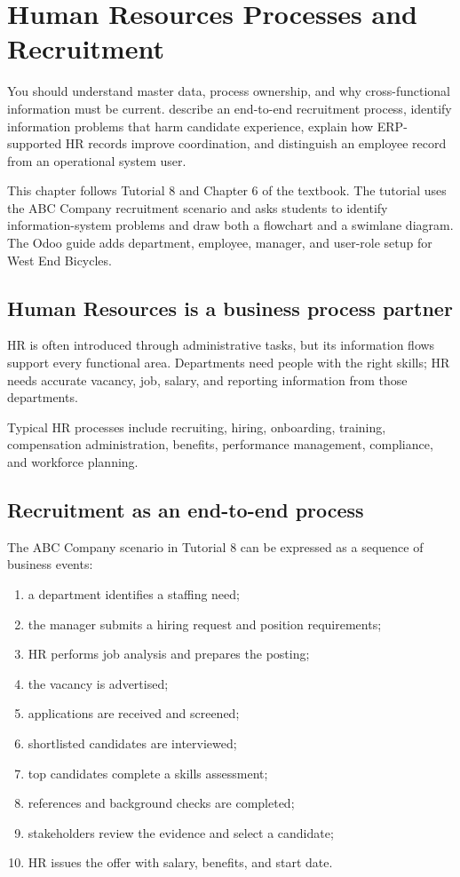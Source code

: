 \chapter{Human Resources Processes and Recruitment}
\label{ch:hr}

\chapterguide
  {You should understand master data, process ownership, and why cross-functional information must be current.}
  {describe an end-to-end recruitment process, identify information problems that harm candidate experience, explain how ERP-supported HR records improve coordination, and distinguish an employee record from an operational system user.}

\begin{sourcebasis}
This chapter follows Tutorial 8 and Chapter 6 of the textbook. The tutorial uses the ABC Company recruitment scenario and asks students to identify information-system problems and draw both a flowchart and a swimlane diagram. The Odoo guide adds department, employee, manager, and user-role setup for West End Bicycles.
\end{sourcebasis}

\section{Human Resources is a business process partner}

HR is often introduced through administrative tasks, but its information flows support every functional area. Departments need people with the right skills; HR needs accurate vacancy, job, salary, and reporting information from those departments.

Typical HR processes include recruiting, hiring, onboarding, training, compensation administration, benefits, performance management, compliance, and workforce planning.

\section{Recruitment as an end-to-end process}

The ABC Company scenario in Tutorial 8 can be expressed as a sequence of business events:

\begin{enumerate}
  \item a department identifies a staffing need;
  \item the manager submits a hiring request and position requirements;
  \item HR performs job analysis and prepares the posting;
  \item the vacancy is advertised;
  \item applications are received and screened;
  \item shortlisted candidates are interviewed;
  \item top candidates complete a skills assessment;
  \item references and background checks are completed;
  \item stakeholders review the evidence and select a candidate;
  \item HR issues the offer with salary, benefits, and start date.
\end{enumerate}

